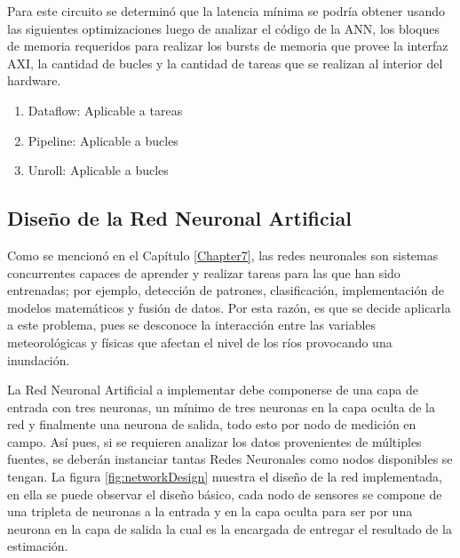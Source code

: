 Para este circuito se determinó que la latencia mínima se podría obtener usando las siguientes optimizaciones luego de analizar el código de la ANN, los bloques de memoria requeridos para realizar los bursts de memoria que provee la interfaz AXI, la cantidad de bucles y la cantidad de tareas que se realizan al interior del hardware.

\begin{enumerate}
\item Dataflow: Aplicable a tareas
\item Pipeline: Aplicable a bucles
\item Unroll: Aplicable a bucles
\end{enumerate}

\subsection{Diseño de la Red Neuronal Artificial}

Como se mencionó en el Capítulo \ref{Chapter7}, las redes neuronales son sistemas concurrentes capaces de aprender y realizar tareas para las que han sido entrenadas; por ejemplo, detección de patrones, clasificación, implementación de modelos matemáticos y fusión de datos. Por esta razón, es que se decide aplicarla a este problema, pues se desconoce la interacción entre las variables meteorológicas y físicas que afectan el nivel de los ríos provocando una inundación.

La Red Neuronal Artificial a implementar debe componerse de una capa de entrada con tres neuronas, un mínimo de tres neuronas en la capa oculta de la red y finalmente una neurona de salida, todo esto por nodo de medición en campo. Así pues, si se requieren analizar los datos provenientes de múltiples fuentes, se deberán instanciar tantas Redes Neuronales como nodos disponibles se tengan. La figura \ref{fig:networkDesign} muestra el diseño de la red implementada, en ella se puede observar el diseño básico, cada nodo de sensores se compone de una tripleta de neuronas a la entrada y en la capa oculta para ser por una neurona en la capa de salida la cual es la encargada de entregar el resultado de la estimación.


